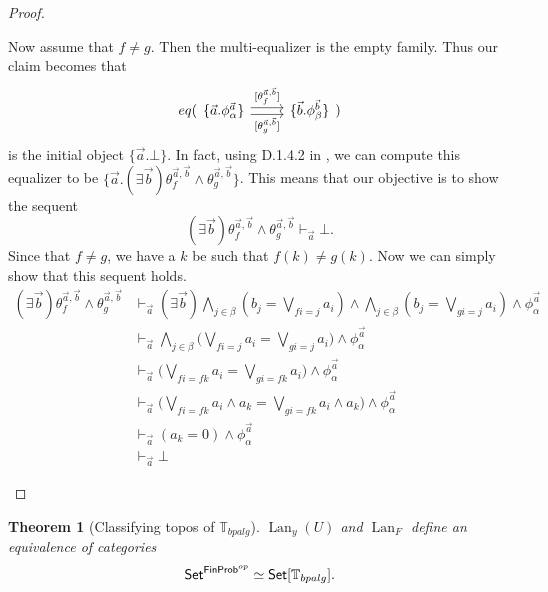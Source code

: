 \documentclass[a4paper]{amsproc}
\theoremstyle{plain}
\newtheorem{theorem}{Theorem}[section]
\theoremstyle{definition}
\theoremstyle{remark}
\numberwithin{equation}{section}
\newcommand{\y}{\textit{y}}
\DeclareMathOperator{\Lan}{Lan}
\newcommand{\Set}{\textup{\textsf{Set}}}
\newcommand{\FinProb}{\textup{\textsf{FinProb}}}
\begin{document}
\begin{proof}
\begin{enumerate}
        Now assume that $f \neq g$. Then the multi-equalizer is the empty family. Thus our claim becomes that
        \[
            eq(\begin{tikzcd}
                \{ \vec{a}.\phi^{\vec{a}}_{\alpha} \} \arrow[r, "{[\theta^{\vec{a},\vec{b}}_f]}", shift left] \arrow[r, "{[\theta^{\vec{a},\vec{b}}_g]}"', shift right] & \{ \vec{b}.\phi^{\vec{b}}_{\beta} \}
                \end{tikzcd})
        \]
        is the initial object $\{\vec{a}.\bot\}$. In fact, using D.1.4.2 in \cite{elephant}, we can compute this equalizer to be $\{ \vec{a} . (\exists \vec{b}) \theta_f^{\vec{a},\vec{b}} \wedge \theta_g^{\vec{a},\vec{b}} \}$. This means that our objective is to show the sequent
        \[
            (\exists \vec{b}) \theta_f^{\vec{a},\vec{b}} \wedge \theta_g^{\vec{a},\vec{b}} \vdash_{\vec{a}} \bot .
        \]
        Since that $f \neq g$, we have a $k$ be such that $f(k) \neq g(k)$. Now we can simply show that this sequent holds.
        \begin{align*}
            (\exists \vec{b}) \theta_f^{\vec{a},\vec{b}} \wedge \theta_g^{\vec{a},\vec{b}}
            &\vdash_{\vec{a}} (\exists \vec{b}) \bigwedge_{j \in \beta} (b_j = \bigvee_{f i = j} a_i) \wedge \bigwedge_{j \in \beta} (b_j = \bigvee_{g i = j} a_i) \wedge \phi_{\alpha}^{\vec{a}} \\
            &\vdash_{\vec{a}} \bigwedge_{j \in \beta} \big ( \bigvee_{f i = j} a_i = \bigvee_{g i = j} a_i \big ) \wedge \phi_{\alpha}^{\vec{a}} \\
            &\vdash_{\vec{a}} \big ( \bigvee_{f i = f k} a_i = \bigvee_{g i = f k} a_i \big ) \wedge \phi_{\alpha}^{\vec{a}} \\
            &\vdash_{\vec{a}} \big ( \bigvee_{f i = f k} a_i \wedge a_k = \bigvee_{g i = f k} a_i \wedge a_k \big ) \wedge \phi_{\alpha}^{\vec{a}}\\
            &\vdash_{\vec{a}} (a_k = 0) \wedge \phi_{\alpha}^{\vec{a}} \\
            &\vdash_{\vec{a}} \bot
        \end{align*}
    \end{enumerate}
\end{proof}

\begin{theorem}[Classifying topos of $\mathbb{T}_{bpalg}$] \label{classifying_presheaf}
$\Lan_{\y}(U)$ and $\Lan_F$ define an equivalence of categories
\[
\Set^{\FinProb^{op}} \simeq \Set[\mathbb{T}_{bpalg}].
\]
\end{theorem}
\end{document}
